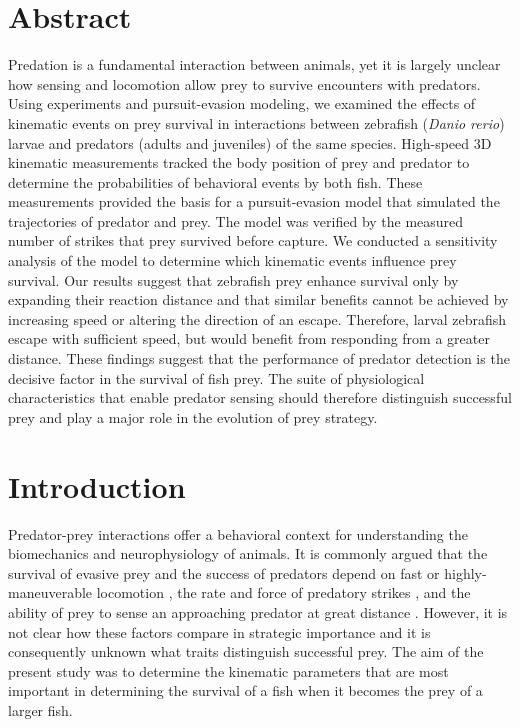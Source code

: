\documentclass[]{rsos}%
\begin{document}
\section*{Abstract}
Predation is a fundamental interaction between animals, yet it is largely unclear how sensing and locomotion allow prey to survive encounters with predators.
Using experiments and pursuit-evasion modeling, we examined the effects of kinematic events on prey survival in interactions between zebrafish (\textit{Danio rerio}) larvae and predators  (adults and juveniles) of the same species.
High-speed 3D kinematic measurements tracked the body position of prey and predator to determine the probabilities of behavioral events by both fish.
These measurements provided the basis for a pursuit-evasion model that simulated the trajectories of predator and prey. 
The model was verified by the measured number of strikes that prey survived before capture.
We conducted a sensitivity analysis of the model to determine which kinematic events influence prey survival.
Our results suggest that zebrafish prey enhance survival only by expanding their reaction distance and that similar benefits cannot be achieved by increasing speed or altering the direction of an escape.
Therefore, larval zebrafish escape with sufficient speed, but would benefit from responding from a greater distance.
These findings suggest that the performance of predator detection is the decisive factor in the survival of fish prey.
The suite of physiological characteristics that enable predator sensing should therefore distinguish successful prey and play a major role in the evolution of prey strategy.

\section{Introduction}

Predator-prey interactions offer a behavioral context for understanding the biomechanics and neurophysiology of animals.
It is commonly argued that the survival of evasive prey and the success of predators depend on fast or highly-maneuverable locomotion \cite{Alexander:BbR35qCj, Wilson:2013fda, Walker:2005vn, Domenici:2011tv, Howland:1974ud}, the rate and force of predatory strikes \cite{deVries:2012tc, Holzman:2009uu}, and the ability of prey to sense an approaching predator at great distance \cite{Dill:1972wh, Gabbiani:1999wz}.
However, it is not clear how these factors compare in strategic importance and it is consequently unknown what traits distinguish successful prey. 
The aim of the present study was to determine the kinematic parameters that are most important in determining the survival of a fish when it becomes the prey of a larger fish.
\end{document}
